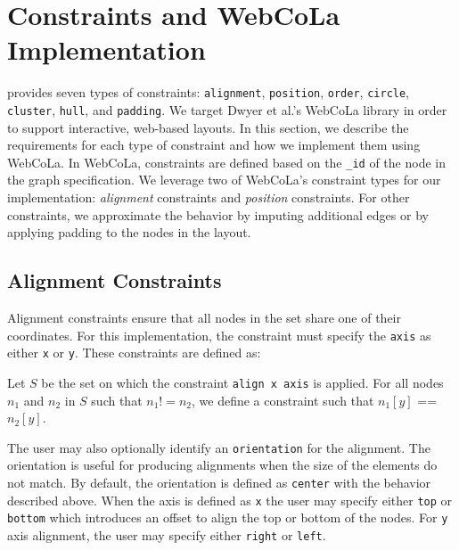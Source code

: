 \section{\projectname Constraints and WebCoLa Implementation}
\label{sec:constraints}

\projectname provides seven types of constraints:
\texttt{alignment}, \texttt{position}, \texttt{order}, \texttt{circle},
\texttt{cluster}, \texttt{hull}, and \texttt{padding}. We
target  Dwyer et al.'s WebCoLa library \cite{WebCoLa} in order to support
interactive, web-based layouts. In this section, we describe the requirements 
for each type of constraint and how we implement them using WebCoLa. 
In WebCoLa, constraints are defined based on the \texttt{\_id} of the
node in the graph specification. We leverage two of WebCoLa's
constraint types for our implementation: \emph{alignment} constraints 
and \emph{position} constraints. For other \projectname constraints, we
approximate the behavior by imputing additional edges or by applying
padding to the nodes in the layout.

\subsection{Alignment Constraints}

Alignment constraints ensure that all nodes in the set share one of their
coordinates. For this implementation, the constraint must specify the \texttt{axis}
as either \texttt{x} or \texttt{y}. These constraints are defined as:

\begin{definition}
Let $S$ be the set on which the constraint \texttt{align x axis} is applied.
For all nodes $n_1$ and $n_2$ in $S$ such that $n_1 != n_2$, we define 
a constraint such that $n_1[y]$ == $n_2[y]$.
\end{definition}


The user may also optionally identify an \texttt{orientation} for the alignment.
The orientation is useful for producing alignments when the size of the 
elements do not match. By default, the orientation is defined as \texttt{center} 
with the behavior described above. When the axis is defined as \texttt{x} 
the user may specify either \texttt{top} or \texttt{bottom} which introduces 
an offset to align the top or bottom of the nodes. For \texttt{y} axis
alignment, the user may specify either \texttt{right} or \texttt{left}.

